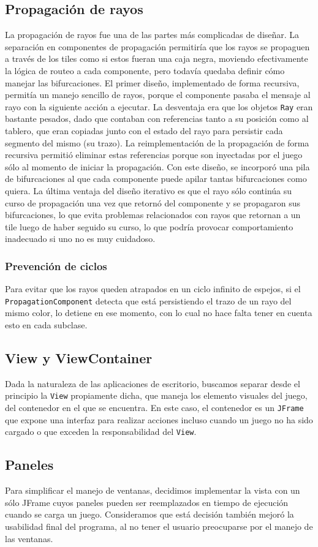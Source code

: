 \documentclass[a4paper, 11pt]{article}
\begin{document}
	\subsection{Propagación de rayos}
	La propagación de rayos fue una de las partes más complicadas de diseñar. La separación en componentes de propagación permitiría que los rayos se propaguen a través de los tiles como si estos fueran una caja negra, moviendo efectivamente la lógica de routeo a cada componente, pero todavía quedaba definir cómo manejar las bifurcaciones. El primer diseño, implementado de forma recursiva, permitía un manejo sencillo de rayos, porque el componente pasaba el mensaje al rayo con la siguiente acción a ejecutar. La desventaja era que los objetos \texttt{Ray} eran bastante pesados, dado que contaban con referencias tanto a su posición como al tablero, que eran copiadas junto con el estado del rayo para persistir cada segmento del mismo (su trazo). La reimplementación de la propagación de forma recursiva permitió eliminar estas referencias porque son inyectadas por el juego sólo al momento de iniciar la propagación. Con este diseño, se incorporó una pila de bifurcaciones al que cada componente puede apilar tantas bifurcaciones como quiera. La última ventaja del diseño iterativo es que el rayo sólo continúa su curso de propagación una vez que retornó del componente y se propagaron sus bifurcaciones, lo que evita problemas relacionados con rayos que retornan a un tile luego de haber seguido su curso, lo que podría provocar comportamiento inadecuado si uno no es muy cuidadoso.

	\subsubsection{Prevención de ciclos}
	Para evitar que los rayos queden atrapados en un ciclo infinito de espejos, si el \texttt{PropagationComponent} detecta que está persistiendo el trazo de un rayo del mismo color, lo detiene en ese momento, con lo cual no hace falta tener en cuenta esto en cada subclase.

	\subsection{View y ViewContainer}
	Dada la naturaleza de las aplicaciones de escritorio, buscamos separar desde el principio la \texttt{View} propiamente dicha, que maneja los elemento visuales del juego, del contenedor en el que se encuentra. En este caso, el contenedor es un \texttt{JFrame} que expone una interfaz para realizar acciones incluso cuando un juego no ha sido cargado o que exceden la responsabilidad del \texttt{View}.

	\subsection{Paneles}
	Para simplificar el manejo de ventanas, decidimos implementar la vista con un sólo JFrame cuyos paneles pueden ser reemplazados en tiempo de ejecución cuando se carga un juego. Consideramos que está decisión también mejoró la usabilidad final del programa, al no tener el usuario preocuparse por el manejo de las ventanas.
\end{document}
